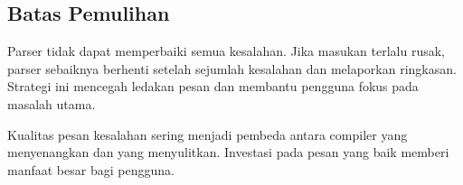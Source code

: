 \subsection{Batas Pemulihan}

Parser tidak dapat memperbaiki semua kesalahan. Jika masukan terlalu
rusak, parser sebaiknya berhenti setelah sejumlah kesalahan dan
melaporkan ringkasan. Strategi ini mencegah ledakan pesan dan
membantu pengguna fokus pada masalah utama.

\begin{infobox}
Kualitas pesan kesalahan sering menjadi pembeda antara compiler yang
menyenangkan dan yang menyulitkan. Investasi pada pesan yang baik
memberi manfaat besar bagi pengguna.
\end{infobox}
